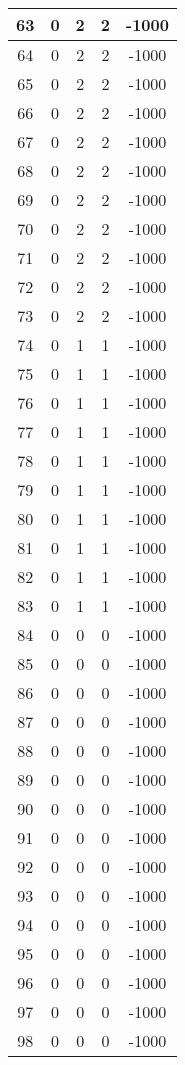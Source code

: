 \documentclass[letterpaper, 12pt]{article}
\begin{document}
\begin{longtable}{|c|c|c|c|c|}
\hline
63 & 0 & 2 & 2 & -1000 \\
\hline
64 & 0 & 2 & 2 & -1000 \\
\hline
65 & 0 & 2 & 2 & -1000 \\
\hline
66 & 0 & 2 & 2 & -1000 \\
\hline
67 & 0 & 2 & 2 & -1000 \\
\hline
68 & 0 & 2 & 2 & -1000 \\
\hline
69 & 0 & 2 & 2 & -1000 \\
\hline
70 & 0 & 2 & 2 & -1000 \\
\hline
71 & 0 & 2 & 2 & -1000 \\
\hline
72 & 0 & 2 & 2 & -1000 \\
\hline
73 & 0 & 2 & 2 & -1000 \\
\hline
74 & 0 & 1 & 1 & -1000 \\
\hline
75 & 0 & 1 & 1 & -1000 \\
\hline
76 & 0 & 1 & 1 & -1000 \\
\hline
77 & 0 & 1 & 1 & -1000 \\
\hline
78 & 0 & 1 & 1 & -1000 \\
\hline
79 & 0 & 1 & 1 & -1000 \\
\hline
80 & 0 & 1 & 1 & -1000 \\
\hline
81 & 0 & 1 & 1 & -1000 \\
\hline
82 & 0 & 1 & 1 & -1000 \\
\hline
83 & 0 & 1 & 1 & -1000 \\
\hline
84 & 0 & 0 & 0 & -1000 \\
\hline
85 & 0 & 0 & 0 & -1000 \\
\hline
86 & 0 & 0 & 0 & -1000 \\
\hline
87 & 0 & 0 & 0 & -1000 \\
\hline
88 & 0 & 0 & 0 & -1000 \\
\hline
89 & 0 & 0 & 0 & -1000 \\
\hline
90 & 0 & 0 & 0 & -1000 \\
\hline
91 & 0 & 0 & 0 & -1000 \\
\hline
92 & 0 & 0 & 0 & -1000 \\
\hline
93 & 0 & 0 & 0 & -1000 \\
\hline
94 & 0 & 0 & 0 & -1000 \\
\hline
95 & 0 & 0 & 0 & -1000 \\
\hline
96 & 0 & 0 & 0 & -1000 \\
\hline
97 & 0 & 0 & 0 & -1000 \\
\hline
98 & 0 & 0 & 0 & -1000 \\

\end{longtable}
\end{document}
